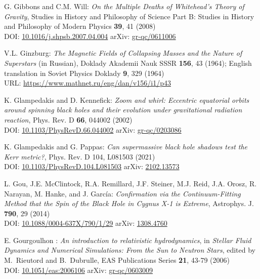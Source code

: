 \begin{thebibliography}{123}
G. Gibbons and C.M. Will: {\em On the Multiple Deaths of Whitehead's Theory of Gravity},
Studies in History and Philosophy of Science Part B: Studies in History and Philosophy of Modern Physics {\bf 39}, 41 (2008)\\
DOI: \href{https://doi.org/10.1016/j.shpsb.2007.04.004}{10.1016/j.shpsb.2007.04.004}\hfill
arXiv: \href{https://arxiv.org/abs/gr-qc/0611006}{gr-qc/0611006}

V.L. Ginzburg:
{\em The Magnetic Fields of Collapsing Masses and the Nature of Superstars}
(in Russian),
Doklady Akademii Nauk SSSR {\bf 156}, 43 (1964); English translation in
Soviet Physics Doklady {\bf 9}, 329 (1964)\\
URL: \url{https://www.mathnet.ru/eng/dan/v156/i1/p43}

K. Glampedakis and D. Kennefick:
{\em Zoom and whirl: Eccentric equatorial orbits around spinning black holes and their evolution under gravitational radiation reaction},
Phys. Rev. D {\bf 66}, 044002 (2002)\\
DOI: \href{https://doi.org/10.1103/PhysRevD.66.044002}{10.1103/PhysRevD.66.044002}\hfill
arXiv: \href{https://arxiv.org/abs/gr-qc/0203086}{gr-qc/0203086}

K. Glampedakis and G. Pappas:
{\em Can supermassive black hole shadows test the Kerr metric?},
Phys. Rev. D 104, L081503 (2021)\\
DOI: \href{https://doi.org/10.1103/PhysRevD.104.L081503}{10.1103/PhysRevD.104.L081503}\hfill
arXiv: \href{https://arxiv.org/abs/2102.13573}{2102.13573}

L. Gou, J.E. McClintock, R.A. Remillard, J.F. Steiner, M.J. Reid, J.A. Orosz, R. Narayan, M. Hanke, and J. García:
{\em Confirmation via the Continuum-Fitting Method that the Spin of the Black Hole in Cygnus X-1 is Extreme},
Astrophys. J. {\bf 790}, 29 (2014)\\
DOI: \href{https://doi.org/10.1088/0004-637X/790/1/29}{10.1088/0004-637X/790/1/29}\hfill
arXiv: \href{https://arxiv.org/abs/1308.4760}{1308.4760}

E. Gourgoulhon :
{\em  An introduction to relativistic hydrodynamics},
in {\em Stellar Fluid Dynamics and Numerical Simulations: From the Sun
to Neutron Stars}, edited by M.~Rieutord and B.~Dubrulle,
EAS Publications Series {\bf 21}, 43-79 (2006) \\
DOI: \href{https://doi.org/10.1051/eas:2006106}{10.1051/eas:2006106}\hfill
arXiv: \href{https://arxiv.org/abs/gr-qc/0603009}{gr-qc/0603009}


\end{thebibliography}
